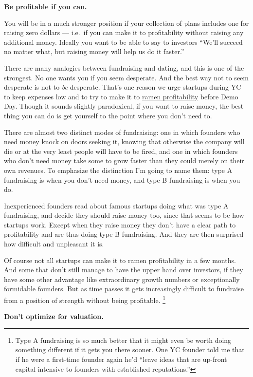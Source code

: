 \textbf{Be profitable if you can.}

You will be in a much stronger position if your collection of plans
includes one for raising zero dollars --- i.e.~if you can make it to
profitability without raising any additional money. Ideally you want to
be able to say to investors ``We'll succeed no matter what, but raising
money will help us do it faster.''

There are many analogies between fundraising and dating, and this is one
of the strongest. No one wants you if you seem desperate. And the best
way not to seem desperate is not to \emph{be} desperate. That's one
reason we urge startups during YC to keep expenses low and to try to
make it to \href{ramenprofitable.html}{ramen profitability} before Demo
Day. Though it sounds slightly paradoxical, if you want to raise money,
the best thing you can do is get yourself to the point where you don't
need to.

There are almost two distinct modes of fundraising: one in which
founders who need money knock on doors seeking it, knowing that
otherwise the company will die or at the very least people will have to
be fired, and one in which founders who don't need money take some to
grow faster than they could merely on their own revenues. To emphasize
the distinction I'm going to name them: type A fundraising is when you
don't need money, and type B fundraising is when you do.

Inexperienced founders read about famous startups doing what was type A
fundraising, and decide they should raise money too, since that seems to
be how startups work. Except when they raise money they don't have a
clear path to profitability and are thus doing type B fundraising. And
they are then surprised how difficult and unpleasant it is.

Of course not all startups can make it to ramen profitability in a few
months. And some that don't still manage to have the upper hand over
investors, if they have some other advantage like extraordinary growth
numbers or exceptionally formidable founders. But as time passes it gets
increasingly difficult to fundraise from a position of strength without
being profitable. \footnote{Type A fundraising is so much better that it might even be
worth doing something different if it gets you there sooner. One YC
founder told me that if he were a first-time founder again he'd ``leave
ideas that are up-front capital intensive to founders with established
reputations.''}

\textbf{Don't optimize for valuation.}

